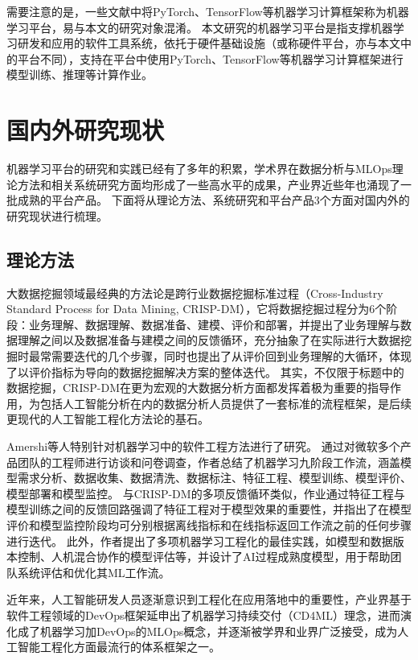 需要注意的是，一些文献中将PyTorch、TensorFlow等机器学习计算框架称为机器学习平台，易与本文的研究对象混淆。
本文研究的机器学习平台是指支撑机器学习研发和应用的软件工具系统，依托于硬件基础设施（或称硬件平台，亦与本文中的平台不同），支持在平台中使用PyTorch、TensorFlow等机器学习计算框架进行模型训练、推理等计算作业。


%
\section{国内外研究现状}

机器学习平台的研究和实践已经有了多年的积累，学术界在数据分析与MLOps理论方法和相关系统研究方面均形成了一些高水平的成果，产业界近些年也涌现了一批成熟的平台产品。
下面将从理论方法、系统研究和平台产品3个方面对国内外的研究现状进行梳理。

\subsection{理论方法}

大数据挖掘领域最经典的方法论是跨行业数据挖掘标准过程（Cross-Industry Standard Process for Data Mining, CRISP-DM）\cite{Wir00}，它将数据挖掘过程分为6个阶段：业务理解、数据理解、数据准备、建模、评价和部署，并提出了业务理解与数据理解之间以及数据准备与建模之间的反馈循环，充分抽象了在实际进行大数据挖掘时最常需要迭代的几个步骤，同时也提出了从评价回到业务理解的大循环，体现了以评价指标为导向的数据挖掘解决方案的整体迭代。
其实，不仅限于标题中的数据挖掘，CRISP-DM在更为宏观的大数据分析方面都发挥着极为重要的指导作用，为包括人工智能分析在内的数据分析人员提供了一套标准的流程框架，是后续更现代的人工智能工程化方法论的基石。

Amershi等人\cite{Ame19}特别针对机器学习中的软件工程方法进行了研究。
通过对微软多个产品团队的工程师进行访谈和问卷调查，作者总结了机器学习九阶段工作流，涵盖模型需求分析、数据收集、数据清洗、数据标注、特征工程、模型训练、模型评价、模型部署和模型监控。
与CRISP-DM的多项反馈循环类似，作业通过特征工程与模型训练之间的反馈回路强调了特征工程对于模型效果的重要性，并指出了在模型评价和模型监控阶段均可分别根据离线指标和在线指标返回工作流之前的任何步骤进行迭代。
此外，作者提出了多项机器学习工程化的最佳实践，如模型和数据版本控制、人机混合协作的模型评估等，并设计了AI过程成熟度模型，用于帮助团队系统评估和优化其ML工作流。

近年来，人工智能研发人员逐渐意识到工程化在应用落地中的重要性，产业界基于软件工程领域的DevOps框架延申出了机器学习持续交付（CD4ML）理念，进而演化成了机器学习加DevOps的MLOps概念，并逐渐被学界和业界广泛接受，成为人工智能工程化方面最流行的体系框架之一。

